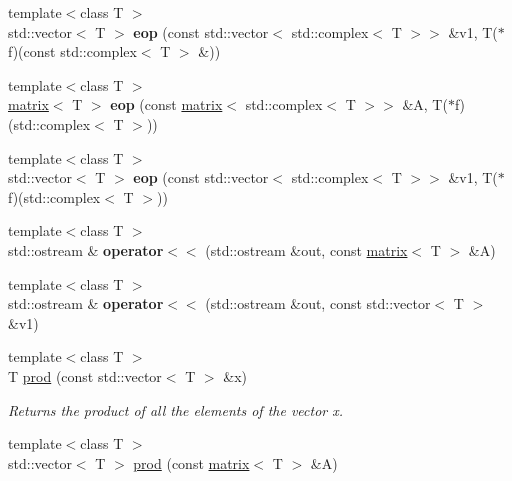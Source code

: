 \begin{DoxyCompactItemize}
\item 
\hypertarget{namespacekeycpp_ad33e9ccd4e31c7c63d31af13d44312e8}{{\footnotesize template$<$class T $>$ }\\std\-::vector$<$ T $>$ {\bfseries eop} (const std\-::vector$<$ std\-::complex$<$ T $>$$>$ \&v1, T($\ast$f)(const std\-::complex$<$ T $>$ \&))}\label{namespacekeycpp_ad33e9ccd4e31c7c63d31af13d44312e8}

\item 
\hypertarget{namespacekeycpp_ae14b016d01024e738c3110299ee58666}{{\footnotesize template$<$class T $>$ }\\\hyperlink{classkeycpp_1_1matrix}{matrix}$<$ T $>$ {\bfseries eop} (const \hyperlink{classkeycpp_1_1matrix}{matrix}$<$ std\-::complex$<$ T $>$$>$ \&A, T($\ast$f)(std\-::complex$<$ T $>$))}\label{namespacekeycpp_ae14b016d01024e738c3110299ee58666}

\item 
\hypertarget{namespacekeycpp_a7f22b23749bd8423cf52448a34280ba4}{{\footnotesize template$<$class T $>$ }\\std\-::vector$<$ T $>$ {\bfseries eop} (const std\-::vector$<$ std\-::complex$<$ T $>$$>$ \&v1, T($\ast$f)(std\-::complex$<$ T $>$))}\label{namespacekeycpp_a7f22b23749bd8423cf52448a34280ba4}

\item 
\hypertarget{namespacekeycpp_a55e8bada51586c0561e1b32ca1ab5f2a}{{\footnotesize template$<$class T $>$ }\\std\-::ostream \& {\bfseries operator$<$$<$} (std\-::ostream \&out, const \hyperlink{classkeycpp_1_1matrix}{matrix}$<$ T $>$ \&A)}\label{namespacekeycpp_a55e8bada51586c0561e1b32ca1ab5f2a}

\item 
\hypertarget{namespacekeycpp_a300d8f6e8992c7b33156492d884bd621}{{\footnotesize template$<$class T $>$ }\\std\-::ostream \& {\bfseries operator$<$$<$} (std\-::ostream \&out, const std\-::vector$<$ T $>$ \&v1)}\label{namespacekeycpp_a300d8f6e8992c7b33156492d884bd621}

\item 
\hypertarget{namespacekeycpp_a5823fd4b932039262a1eddb2f4f47299}{{\footnotesize template$<$class T $>$ }\\T \hyperlink{namespacekeycpp_a5823fd4b932039262a1eddb2f4f47299}{prod} (const std\-::vector$<$ T $>$ \&x)}\label{namespacekeycpp_a5823fd4b932039262a1eddb2f4f47299}

\begin{DoxyCompactList}\small\item\em Returns the product of all the elements of the vector x. \end{DoxyCompactList}\item 
\hypertarget{namespacekeycpp_a9ff26fd7007c28ea88b3ad7cdf90546c}{{\footnotesize template$<$class T $>$ }\\std\-::vector$<$ T $>$ \hyperlink{namespacekeycpp_a9ff26fd7007c28ea88b3ad7cdf90546c}{prod} (const \hyperlink{classkeycpp_1_1matrix}{matrix}$<$ T $>$ \&A)}\label{namespacekeycpp_a9ff26fd7007c28ea88b3ad7cdf90546c}


\end{DoxyCompactItemize}
